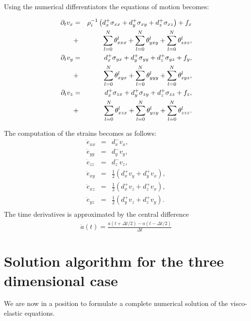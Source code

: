 \documentclass[11pt]{article}
\begin{document}
Using the numerical differentiators the equations of motion becomes:

\begin{eqnarray}
  \partial_t{v}_x & = & \rho^{-1}_i\left(d^+_x \sigma_{xx} +d^+_y \sigma_{xy} +d^+_z \sigma_{xz}\right) + f_x \\
           & + & \sum_{l=0}^N\theta^l_{xxx} +  \sum_{l=0}^N\theta^l_{yxy} +  \sum_{l=0}^N\theta^l_{zxz}, \\ 
  \partial_t{v}_y & = & d^+_x \sigma_{yx} +d^+_y \sigma_{yy} +d^+_z \sigma_{yz} + f_y, \\
           & + & \sum_{l=0}^N\theta^l_{xyx} +  \sum_{l=0}^N\theta^l_{yyy} +  \sum_{l=0}^N\theta^l_{zyz}, \\ 
  \partial_t{v}_z & = & d^+_x \sigma_{zx} +d^+_y \sigma_{zy} +d^+_z \sigma_{zz} + f_z, \\
           & + & \sum_{l=0}^N\theta^l_{xzx} +  \sum_{l=0}^N\theta^l_{yzy} +  \sum_{l=0}^N\theta^l_{zzz}.
\end{eqnarray}

The computation of the strains becomes as follows:
\begin{eqnarray}
    \dot{e}_{xx} & = & d^-_x v_x, \nonumber \\
    \dot{e}_{yy} & = & d^-_y v_y, \nonumber \\
    \dot{e}_{zz} & = & d^-_z v_z, \nonumber \\
    \dot{e}_{xy} & = & \frac{1}{2}(d^+_x v_y + d^+_y v_x),\nonumber\\
    \dot{e}_{xz} & = & \frac{1}{2}(d^+_x v_z + d^+_z v_x),\nonumber\\
    \dot{e}_{yz} & = & \frac{1}{2}(d^+_y v_z +d^+_z v_y).\nonumber\\
                \label{eq:strains}
\end{eqnarray}
The time derivatives is approximated by the central difference
\begin{eqnarray}
\dot{a}(t) = \frac{a(t+\Delta t/2) - a(t-\Delta t/2)}{\Delta t}
                      \label{eq:time-derivative}
\end{eqnarray}

\section*{Solution algorithm for the three dimensional case}
We are now in a position to formulate a complete numerical 
solution of the visco-elastic equations.
\end{document}

